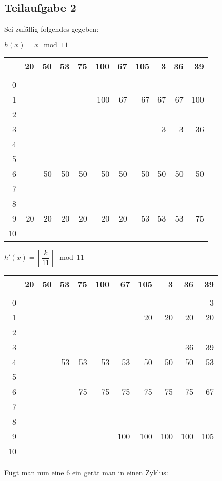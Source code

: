 \documentclass[a4paper, fontsize=10pt]{scrartcl}
\begin{document}
\subsection*{Teilaufgabe 2}

Sei zufällig folgendes gegeben:\bigskip

\begin{center}
    $h(x)=x\mod 11 $\smallskip

    \begin{tabular}{r|rrrrrrrrrr}
      &20 & 50 & 53 & 75 & 100 & 67 & 105 & 3 & 36 & 39\\
      \hline\\
      0 \\
      1 &&&&&100&67&67&67&67&100\\
      2 \\
      3 &&&&&&&&3&3&36\\
      4 \\
      5 \\
      6 &&50&50&50&50&50&50&50&50&50\\
      7 \\
      8 \\
      9 &20&20&20&20&20&20&53&53&53&75\\
      10 \\
    \end{tabular}
  \bigskip

 $h'(x)=\left\lfloor \dfrac{k}{11}\right\rfloor \mod 11$\smallskip
 
      \begin{tabular}{r|rrrrrrrrrr}
      &20 & 50 & 53 & 75 & 100 & 67 & 105 & 3 & 36 & 39\\
      \hline\\
      0 &&&&&&&&&&3\\
      1 &&&&&&&20&20&20&20\\
      2 \\
      3 &&&&&&&&&36&39\\
      4 &&&53&53&53&53&50&50&50&53\\
      5 \\
      6 &&&&75&75&75&75&75&75&67\\
      7 \\
      8 \\
      9 &&&&&&100&100&100&100&105\\
      10 \\
    \end{tabular}
    \newpage
    
    
  Fügt man nun eine 6 ein gerät man in einen Zyklus:\bigskip
  

\end{center}
\end{document}
